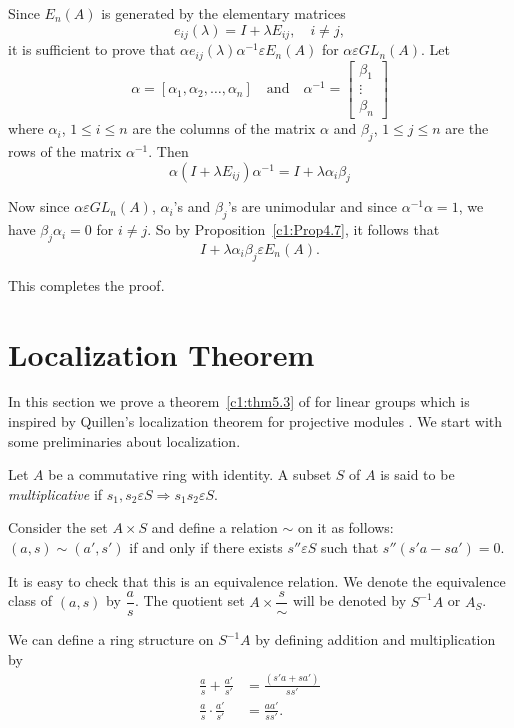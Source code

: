 \begin{Prf}
Since $E_n(A)$ is generated by the elementary matrices
$$
e_{ij}(\lambda)=I+\lambda E_{ij}, \quad i\neq j,
$$
it is sufficient to prove that $\alpha
e_{ij}(\lambda)\alpha^{-1}\varepsilon E_n(A)$ for $\alpha \varepsilon
GL_n(A)$. Let 
$$
\alpha=[\alpha_1,\alpha_2,\ldots,\alpha_n] \quad
\text{and}\quad\alpha^{-1}=\begin{bmatrix}
\beta_1\\
\vdots\\
\beta_n
\end{bmatrix}
$$
where $\alpha_i$, $1\leq i\leq n$ are the columns of the matrix
$\alpha$ and $\beta_j$, $1\leq j\leq n$ are the rows of the matrix
$\alpha^{-1}$. Then 
$$
\alpha(I+\lambda E_{ij})\alpha^{-1}=I+\lambda \alpha_i\beta_j
$$

Now since $\alpha \varepsilon GL_n(A)$, $\alpha_i$'s and $\beta_j$'s
are unimodular and since $\alpha^{-1}\alpha=1$, we have
$\beta_j\alpha_i=0$ for $i\neq j$. So by Proposition~\ref{c1:Prop4.7}, it
follows that 
$$
I+\lambda\alpha_i\beta_j\varepsilon E_n(A).
$$

This completes the proof.
\enprf
\end{Prf}

\section{Localization Theorem}\label{c1:s5}

In this section we prove a theorem~\ref{c1:thm5.3} of \citeauthor{Suslina} for linear
groups which is inspired by Quillen's localization theorem for
projective modules \cite{Quillen}. We start with some preliminaries
about localization.

Let $A$ be a commutative ring with identity. A subset $S$ of $A$ is
said to be \textit{multiplicative} if $s_1,s_2 \varepsilon
S\Rightarrow s_1s_2\varepsilon S$. 

Consider the set $A\times S$ and define a relation $\sim$ on it as
follows: $(a,s)\sim (a',s')$ if and only if there exists
$s''\varepsilon S$ such that $s''(s'a-sa')=0$.

It is easy to check that this is an equivalence relation. We denote
the equivalence class of $(a,s)$ by $\dfrac{a}{s}$. The quotient set
$A\times \dfrac{s}{\sim}$ will be denoted by $S^{-1}A$ or $A_S$.

We can define a ring structure on $S^{-1}A$ by defining addition and
multiplication by 
\begin{align*}
\frac{a}{s}+\frac{a'}{s'}&=\frac{(s'a+sa')}{ss'}\\
\frac{a}{s}\cdot \frac{a'}{s'}&=\frac{aa'}{ss'}.
\end{align*}

